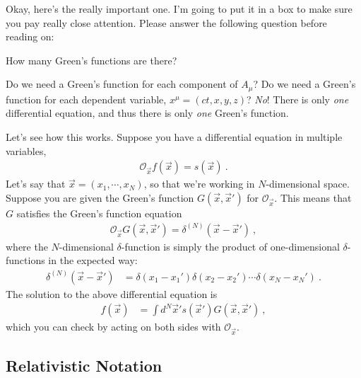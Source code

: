 Okay, here's the really important one. I'm going to put it in a box to make sure you pay really close attention. Please answer the following question before reading on:
\begin{framed}
\centering
How many Green's functions are there?
\end{framed}
Do we need a Green's function for each component of $A_\mu$? Do we need a Green's function for each dependent variable, $x^\mu = (ct,x,y,z)$? \emph{No}! There is only \emph{one} differential equation, and thus there is only \emph{one} Green's function. 

Let's see how this works. Suppose you have a differential equation in multiple variables,
\begin{align}
	\mathcal O_\vec{x} f(\vec{x}) = s(\vec{x}) \ .
\end{align}
Let's say that $\vec{x}=(x_1, \cdots, x_N)$, so that we're working in $N$-dimensional space. Suppose you are given the Green's function $G(\vec{x},\vec{x}')$ for $\mathcal O_\vec{x}$. This means that $G$ satisfies the Green's function equation
\begin{align}
	\mathcal O_\vec{x} G(\vec{x},\vec{x}') = \delta^{(N)}(\vec{x}-\vec{x}') \ ,
\end{align}
where the $N$-dimensional $\delta$-function is simply the product of one-dimensional $\delta$-functions in the expected way:
\begin{align}
	\delta^{(N)}(\vec{x}-\vec{x}') 
	&=
	\delta(x_1-x_1')\delta(x_2-x_2')\cdots\delta(x_N-x_N') \ .
\end{align}
The solution to the above differential equation is
\begin{align}
	f(\vec{x}) &= \int d^N\vec{x}' s(\vec{x}') G(\vec{x},\vec{x}') \ ,
\end{align}
which you can check by acting on both sides with $\mathcal O_\vec{x}$.

\subsection{Relativistic Notation}

